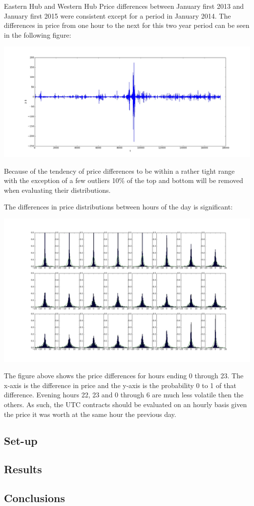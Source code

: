 \documentclass{report}
\begin{document}
Eastern Hub and Western Hub Price differences between January first 2013 and
January first 2015 were consistent except for a period in January 2014. The differences in
price from one hour to the next for this two year period can be seen in the
following figure:
\begin{center}
\includegraphics[width=500pt, keepaspectratio=true]{price_differences.jpg}\\
\end{center}
Because of the tendency of price differences to be within a rather tight range
with the exception of a few outliers 10\% of the top and bottom will be removed when
evaluating their distributions.

The differences in price distributions between hours of the day is significant:
\begin{center}
\includegraphics[width=500pt, keepaspectratio=true]{hourly_distributions.jpg}\\
\end{center}
The figure above shows the price differences for hours ending 0 through 23. The x-axis
is the difference in price and the y-axis is the probability 0 to 1 of that difference.
Evening hours 22, 23 and 0 through 6 are much less volatile then the others. As such,
the UTC contracts should be evaluated on an hourly basis given the price it was
worth at the same hour the previous day.

\subsection*{Set-up}
\subsection*{Results}
\subsection*{Conclusions}

\nocite{*}


\end{document}
